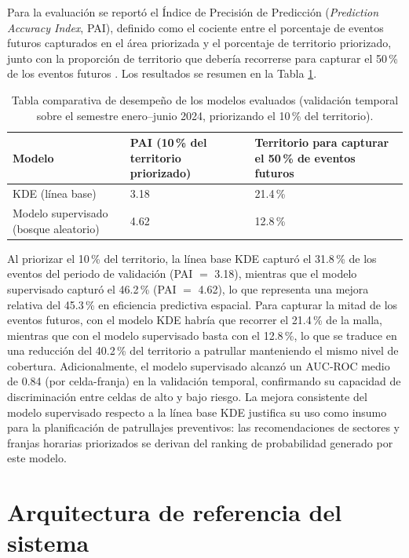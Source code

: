Para la evaluaci\'on se report\'o el \'Indice de Precisi\'on de Predicci\'on (\textit{Prediction Accuracy Index}, PAI), definido como el cociente entre el porcentaje de eventos futuros capturados en el \'area priorizada y el porcentaje de territorio priorizado, junto con la proporci\'on de territorio que deber\'ia recorrerse para capturar el 50\,\% de los eventos futuros \citep{chainey2008kde}. Los resultados se resumen en la Tabla \ref{tab:comparativo}.

\begin{table}[H]
\centering
\caption[Comparativa de desempe\~no de los modelos evaluados]{Tabla comparativa de desempe\~no de los modelos evaluados (validaci\'on temporal sobre el semestre enero--junio 2024, priorizando el 10\,\% del territorio).}
\setlength{\tabcolsep}{4pt}
\begin{tabular}{p{4.3cm}p{3.4cm}p{4.3cm}}
\toprule
Modelo & PAI (10\,\% del territorio priorizado) & Territorio para capturar el 50\,\% de eventos futuros \\
\midrule
KDE (l\'inea base)             & 3.18 & 21.4\,\% \\
Modelo supervisado (bosque aleatorio) & 4.62 & 12.8\,\% \\
\bottomrule
\end{tabular}
\label{tab:comparativo}
\end{table}

Al priorizar el 10\,\% del territorio, la l\'inea base KDE captur\'o el 31.8\,\% de los eventos del periodo de validaci\'on (PAI $=$ 3.18), mientras que el modelo supervisado captur\'o el 46.2\,\% (PAI $=$ 4.62), lo que representa una mejora relativa del 45.3\,\% en eficiencia predictiva espacial. Para capturar la mitad de los eventos futuros, con el modelo KDE habr\'ia que recorrer el 21.4\,\% de la malla, mientras que con el modelo supervisado basta con el 12.8\,\%, lo que se traduce en una reducci\'on del 40.2\,\% del territorio a patrullar manteniendo el mismo nivel de cobertura. Adicionalmente, el modelo supervisado alcanz\'o un AUC-ROC medio de 0.84 (por celda-franja) en la validaci\'on temporal, confirmando su capacidad de discriminaci\'on entre celdas de alto y bajo riesgo. La mejora consistente del modelo supervisado respecto a la l\'inea base KDE justifica su uso como insumo para la planificaci\'on de patrullajes preventivos: las recomendaciones de sectores y franjas horarias priorizados se derivan del ranking de probabilidad generado por este modelo.

\section{Arquitectura de referencia del sistema}

